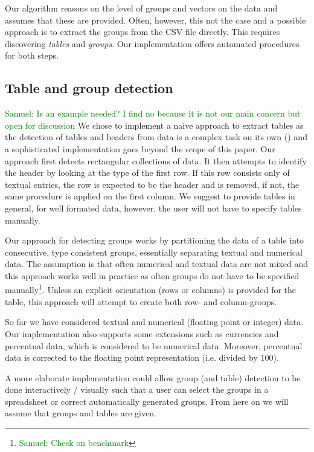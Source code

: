 \documentclass{sig-alternate-05-2015}
\newcommand{\samuel}[1]{\textcolor{green}{{\sc Samuel:} #1}\xspace}
\begin{document}
Our algorithm reasons on the level of groups and vectors on the data and assumes that these are provided.
Often, however, this not the case and a possible approach is to extract the groups from the CSV file directly.
This requires discovering \textit{tables} and \textit{groups}.
Our implementation offers automated procedures for both steps.



\subsection{Table and group detection}
\samuel{Is an example needed? I find no because it is not our main concern but open for discussion}
We chose to implement a naive approach to extract tables as the detection of tables and headers from data is a complex task on its own (\cite{header}) and a sophisticated implementation goes beyond the scope of this paper.
Our approach first detects rectangular collections of data.
It then attempts to identify the header by looking at the type of the first row.
If this row consists only of textual entries, the row is expected to be the header and is removed, if not, the same procedure is applied on the first column.
We suggest to provide tables in general, for well formated data, however, the user will not have to specify tables manually.

Our approach for detecting groups works by partitioning the data of a table into consecutive, type consistent groups, essentially separating textual and numerical data.
The assumption is that often numerical and textual data are not mixed and this approach works well in practice as often groups do not have to be specified manually\footnote{\samuel{Check on benchmark}}.
Unless an explicit orientation (rows or columns) is provided for the table, this approach will attempt to create both row- and column-groups.

So far we have considered textual and numerical (floating point or integer) data.
Our implementation also supports some extensions such as currencies and percentual data, which is considered to be numerical data.
Moreover, percentual data is corrected to the floating point representation (i.e. divided by 100).

A more elaborate implementation could allow group (and table) detection to be done interactively / visually such that a user can select the groups in a spreadsheet or correct automatically generated groups.
From here on we will assume that groups and tables are given.
\end{document}
